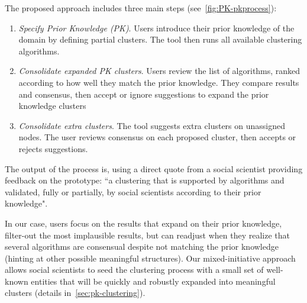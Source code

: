 The proposed approach includes three main steps (see~\autoref{fig:PK-pkprocess}):
\begin{enumerate}[nosep]
\item \textit{Specify Prior Knowledge (PK)}. Users  introduce their prior knowledge of the domain by defining partial clusters. The tool then runs all available clustering algorithms.
\item \textit{Consolidate expanded PK clusters}. Users review the list of algorithms, ranked according to how well they match the prior knowledge.  They compare results and consensus, then accept or ignore suggestions to expand the prior knowledge clusters
\item \textit{Consolidate extra clusters}. The tool suggests extra clusters on unassigned nodes. The user reviews consensus on each proposed cluster, then accepts or rejects suggestions.
\end{enumerate}

The output of the process is, using a direct quote from a social scientist providing feedback on the prototype: ``a clustering that is supported by algorithms and validated, fully or partially, by social scientists according to their prior knowledge".


In our case, users focus on the results that expand on their prior knowledge, filter-out the most implausible results, but can readjust  when they realize that several algorithms are consensual despite not matching the prior knowledge (hinting at other possible meaningful structures). Our   mixed-initiative approach allows social scientists to seed the clustering process with a small set of well-known entities that will be quickly and robustly expanded into meaningful clusters (details in~\autoref{sec:pk-clustering}).

